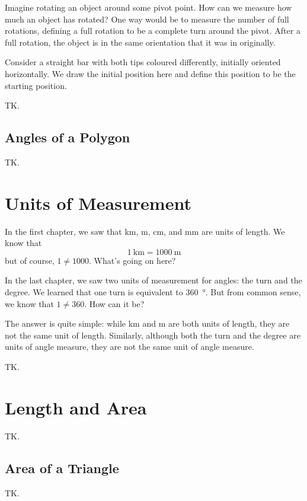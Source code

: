\documentclass[a4paper,10pt]{report}
\begin{document}
Imagine rotating an object around some pivot point. How can we measure how much
an object has rotated? One way would be to measure the number of full rotations,
defining a full rotation to be a complete turn around the pivot. After a full
rotation, the object is in the same orientation that it was in originally.

Consider a straight bar with both tips coloured differently, initially oriented
horizontally. We draw the initial position here and define this position to be
the starting position.

TK.

\section{Angles of a Polygon}

TK.

\chapter{Units of Measurement}

In the first chapter, we saw that \si{\kilo\metre}, \si{\metre},
\si{\centi\metre}, and \si{\milli\metre} are units of length. We know that \[
  \SI{1}{\kilo\metre} = \SI{1000}{\metre}
\] but of course, \(1\ne1000\). What's going on here?

In the last chapter, we saw two units of measurement for angles: the turn and
the degree. We learned that one turn is equivalent to \SI{360}{\degree}. But
from common sense, we know that \(1 \ne 360\). How can it be?

The answer is quite simple: while \si{\kilo\metre} and \si{\metre} are both
units of length, they are not the same unit of length. Similarly, although both
the turn and the degree are units of angle measure, they are not the same unit
of angle measure.

TK.

\chapter{Length and Area}

TK.

\section{Area of a Triangle}

TK.
\end{document}
